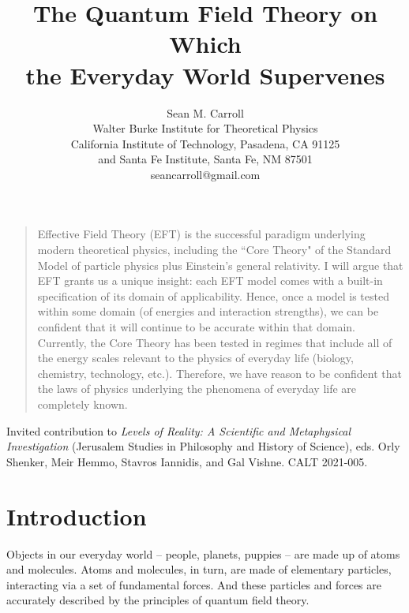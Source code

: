 \documentclass[12pt,letterpaper]{article}
\begin{document}
 

\title{The Quantum Field Theory on Which \\ the Everyday World Supervenes}

 \author{Sean M. Carroll\\
 Walter Burke Institute for Theoretical Physics\\
 California Institute of Technology, Pasadena, CA 91125\\
 and Santa Fe Institute, Santa Fe, NM 87501\\
 seancarroll@gmail.com}
\maketitle

\begin{quotation} \noindent
Effective Field Theory (EFT) is the successful paradigm underlying modern theoretical physics, including the ``Core Theory" of the Standard Model of particle physics plus Einstein's general relativity. I will argue that EFT grants us a unique insight: each EFT model comes with a built-in specification of its domain of applicability. Hence, once a model is tested within some domain (of energies and interaction strengths), we can be confident that it will continue to be accurate within that domain. Currently, the Core Theory has been tested in regimes that include all of the energy scales relevant to the physics of everyday life (biology, chemistry, technology, etc.). Therefore, we have reason to be confident that the laws of physics underlying the phenomena of everyday life are completely known.
\end{quotation}


\vfill
\noindent
Invited contribution to \textit{Levels of Reality: A Scientific and Metaphysical Investigation} (Jerusalem Studies in Philosophy and History of Science), eds. Orly Shenker, Meir Hemmo, Stavros Iannidis, and Gal Vishne. CALT 2021-005.

\newpage

\section{Introduction}

Objects in our everyday world -- people, planets, puppies -- are made up of atoms and molecules. 
Atoms and molecules, in turn, are made of elementary particles, interacting via a set of fundamental forces.
And these particles and forces are accurately described by the principles of quantum field theory.
\end{document}
